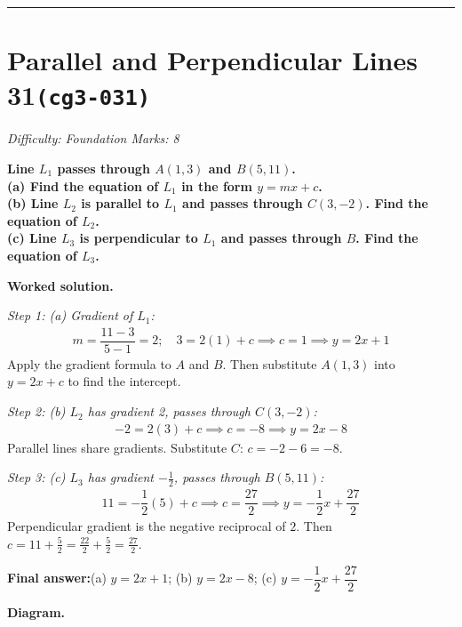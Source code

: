 \documentclass[11pt]{article}
\newcommand{\question}[1]{\par\medskip\noindent\textbf{#1}\par}
\begin{document}
\medskip\hrule

\section*{Parallel and Perpendicular Lines 31\quad\small\texttt{(cg3-031)}}
\textit{Difficulty: Foundation \quad\textbar\quad Marks: 8}

\question{Line \( L_1 \) passes through \( A(1, 3) \) and \( B(5, 11) \). \\[3pt] (a) Find the equation of \( L_1 \) in the form \( y = mx + c \). \\[3pt] (b) Line \( L_2 \) is parallel to \( L_1 \) and passes through \( C(3, -2) \). Find the equation of \( L_2 \). \\[3pt] (c) Line \( L_3 \) is perpendicular to \( L_1 \) and passes through \( B \). Find the equation of \( L_3 \).}

\textbf{Worked solution.}

\textit{Step 1: (a) Gradient of \( L_1 \):}
\[\begin{gathered}
m = \dfrac{11-3}{5-1} = 2; \quad 3 = 2(1) + c \implies c = 1 \implies y = 2x + 1
\end{gathered}\]
Apply the gradient formula to \( A \) and \( B \). Then substitute \( A(1, 3) \) into \( y = 2x + c \) to find the intercept.

\textit{Step 2: (b) \( L_2 \) has gradient 2, passes through \( C(3, -2) \):}
\[\begin{gathered}
-2 = 2(3) + c \implies c = -8 \implies y = 2x - 8
\end{gathered}\]
Parallel lines share gradients. Substitute \( C \): \( c = -2 - 6 = -8 \).

\textit{Step 3: (c) \( L_3 \) has gradient \( -\frac{1}{2} \), passes through \( B(5, 11) \):}
\[\begin{gathered}
11 = -\dfrac{1}{2}(5) + c \implies c = \dfrac{27}{2} \implies y = -\dfrac{1}{2}x + \dfrac{27}{2}
\end{gathered}\]
Perpendicular gradient is the negative reciprocal of \( 2 \). Then \( c = 11 + \tfrac{5}{2} = \tfrac{22}{2} + \tfrac{5}{2} = \tfrac{27}{2} \).

\begin{answerbox}
\textbf{Final answer:}\quad (a) \(\displaystyle y = 2x + 1\); (b) \(\displaystyle y = 2x - 8\); (c) \(\displaystyle y = -\dfrac{1}{2}x + \dfrac{27}{2}\)
\end{answerbox}
\textbf{Diagram.}
\end{document}
